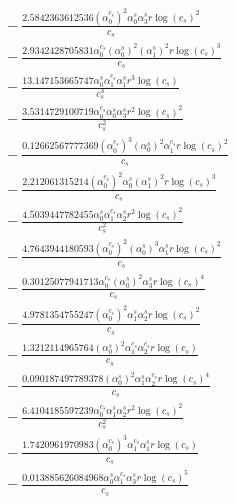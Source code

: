 \documentclass[10pt]{article}
\begin{document}
\begin{align*}
&{}  - \frac{2.5842363612536 \left(\alpha_{0}^{c_s}\right)^{2} \alpha_{0}^s \alpha_{3}^s r \log{\left(c_{s} \right)}^{2}}{c_{s}} \\
&{}  - \frac{2.9342428705831 \alpha_{0}^{c_s} \left(\alpha_{0}^s\right)^{2} \left(\alpha_{1}^s\right)^{2} r \log{\left(c_{s} \right)}^{3}}{c_{s}} \\
&{}  - \frac{13.147153665747 \alpha_{0}^s \alpha_{1}^{c_s} \alpha_{1}^s r^{3} \log{\left(c_{s} \right)}}{c_{s}^{3}} \\
&{}  - \frac{3.5314729100719 \alpha_{0}^{c_s} \alpha_{0}^s \alpha_{3}^s r^{2} \log{\left(c_{s} \right)}^{2}}{c_{s}^{2}} \\
&{}  - \frac{0.12662567777369 \left(\alpha_{0}^{c_s}\right)^{3} \left(\alpha_{0}^s\right)^{2} \alpha_{1}^{c_s} r \log{\left(c_{s} \right)}^{2}}{c_{s}} \\
&{}  - \frac{2.212061315214 \left(\alpha_{0}^{c_s}\right)^{2} \alpha_{0}^s \left(\alpha_{1}^s\right)^{2} r \log{\left(c_{s} \right)}^{3}}{c_{s}} \\
&{}  - \frac{4.5039447782455 \alpha_{0}^s \alpha_{1}^{c_s} \alpha_{2}^s r^{2} \log{\left(c_{s} \right)}^{2}}{c_{s}^{2}} \\
&{}  - \frac{4.7643944180593 \left(\alpha_{0}^{c_s}\right)^{2} \left(\alpha_{0}^s\right)^{3} \alpha_{1}^s r \log{\left(c_{s} \right)}^{2}}{c_{s}} \\
&{}  - \frac{0.30125077941713 \alpha_{0}^{c_s} \left(\alpha_{0}^s\right)^{2} \alpha_{3}^s r \log{\left(c_{s} \right)}^{4}}{c_{s}} \\
&{}  - \frac{4.9781354755247 \left(\alpha_{0}^{c_s}\right)^{2} \alpha_{1}^s \alpha_{2}^s r \log{\left(c_{s} \right)}^{2}}{c_{s}} \\
&{}  - \frac{1.3212114965764 \left(\alpha_{0}^s\right)^{2} \alpha_{1}^{c_s} \alpha_{2}^{c_s} r \log{\left(c_{s} \right)}}{c_{s}} \\
&{}  - \frac{0.090187497789378 \left(\alpha_{0}^s\right)^{2} \alpha_{1}^s \alpha_{2}^{c_s} r \log{\left(c_{s} \right)}^{4}}{c_{s}} \\
&{}  - \frac{6.4104185597239 \alpha_{0}^{c_s} \alpha_{1}^s \alpha_{2}^s r^{2} \log{\left(c_{s} \right)}^{2}}{c_{s}^{2}} \\
&{}  - \frac{1.7420961970983 \left(\alpha_{0}^{c_s}\right)^{3} \alpha_{1}^{c_s} \alpha_{1}^s r \log{\left(c_{s} \right)}}{c_{s}} \\
&{}  - \frac{0.013885626084968 \alpha_{0}^s \alpha_{1}^{c_s} \alpha_{3}^s r \log{\left(c_{s} \right)}^{5}}{c_{s}} \\

\end{align*}
\end{document}
